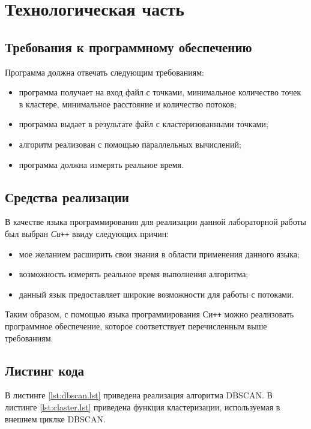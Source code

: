 \chapter{Технологическая часть}

\section{Требования к программному обеспечению}

Программа должна отвечать следующим требованиям:
\begin{itemize}[label=---]
	\item программа получает на вход файл с точками, минимальное количество точек в кластере, минимальное расстояние и количество потоков;
	\item программа выдает в результате файл с кластеризованными точками;
	\item алгоритм реализован с помощью параллельных вычислений;
	\item программа должна измерять реальное время.
\end{itemize}

\section{Средства реализации}

В качестве языка программирования для реализации данной лабораторной работы был выбран \textit{Си\texttt{++}} ввиду следующих причин:
\begin{itemize}[label=---]
	\item мое желанием расширить свои знания в области применения данного языка;
	\item возможность измерять реальное время выполнения алгоритма;
	\item данный язык предоставляет широкие возможности для работы с потоками.
\end{itemize}

Таким образом, с помощью языка программирования Си\texttt{++} можно реализовать программное обеспечение, которое соответствует перечисленным выше требованиям.

\section{Листинг кода}

В листинге \ref{lst:dbscan.lst} приведена реализация алгоритма DBSCAN.
В листинге \ref{lst:claster.lst} приведена функция кластеризации, используемая в внешнем циклке DBSCAN.
\clearpage
{}
\clearpage	
{}
\clearpage

